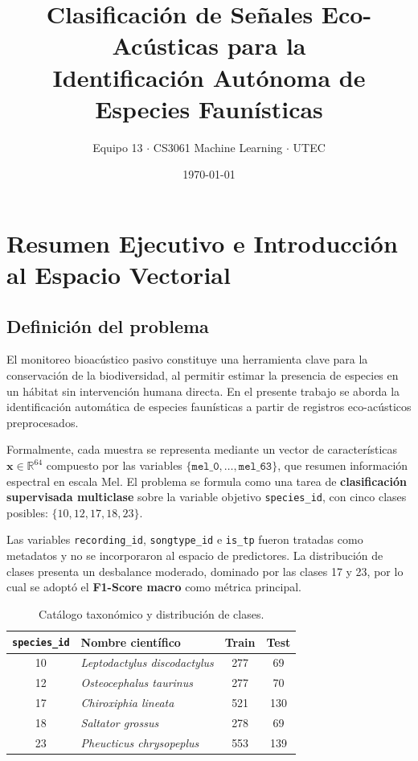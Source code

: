 \documentclass[10pt,a4paper]{article}
\title{\vspace{-1.5em}\textbf{Clasificaci\'on de Se\~nales Eco-Ac\'usticas para la\\
Identificaci\'on Aut\'onoma de Especies Faun\'isticas}\vspace{-0.3em}}
\author{\small Equipo 13 $\cdot$ CS3061 Machine Learning $\cdot$ UTEC}
\date{\vspace{-1em}\small \today}
\begin{document}
\maketitle
\vspace{-1.5em}

\section{Resumen Ejecutivo e Introducci\'on al Espacio Vectorial}

\subsection{Definici\'on del problema}
El monitoreo bioac\'ustico pasivo constituye una herramienta clave para la
conservaci\'on de la biodiversidad, al permitir estimar la presencia de especies
en un h\'abitat sin intervenci\'on humana directa. En el presente trabajo se aborda
la identificaci\'on autom\'atica de especies faun\'isticas a partir de registros
eco-ac\'usticos preprocesados.

Formalmente, cada muestra se representa mediante un vector de caracter\'isticas
$\mathbf{x} \in \mathbb{R}^{64}$ compuesto por las variables
$\{\texttt{mel\_0}, \dots, \texttt{mel\_63}\}$, que resumen informaci\'on espectral
en escala Mel. El problema se formula como una tarea de \textbf{clasificaci\'on
supervisada multiclase} sobre la variable objetivo \texttt{species\_id}, con cinco
clases posibles: $\{10,12,17,18,23\}$.

Las variables \texttt{recording\_id}, \texttt{songtype\_id} e \texttt{is\_tp}
fueron tratadas como metadatos y no se incorporaron al espacio de predictores.
La distribuci\'on de clases presenta un desbalance moderado, dominado por las
clases 17 y 23, por lo cual se adopt\'o el \textbf{F1-Score macro} como m\'etrica
principal.

\begin{table}[H]
\centering
\caption{Cat\'alogo taxon\'omico y distribuci\'on de clases.}
\label{tab:taxonomia}
\small
\begin{tabular}{clcc}
\toprule
\texttt{species\_id} & Nombre cient\'ifico & Train & Test \\
\midrule
10 & \textit{Leptodactylus discodactylus} & 277 & 69 \\
12 & \textit{Osteocephalus taurinus}      & 277 & 70 \\
17 & \textit{Chiroxiphia lineata}         & 521 & 130 \\
18 & \textit{Saltator grossus}            & 278 & 69 \\
23 & \textit{Pheucticus chrysopeplus}     & 553 & 139 \\
\bottomrule
\end{tabular}
\end{table}
\end{document}
